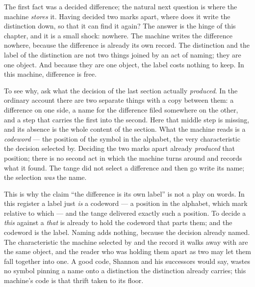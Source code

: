 The first fact was a decided difference; the natural next question is where the machine \emph{stores} it. Having
decided two marks apart, where does it write the distinction down, so that it can find it again? The answer is the
hinge of this chapter, and it is a small shock: nowhere. The machine writes the difference nowhere, because the
difference is already its own record. The distinction and the label of the distinction are not two things joined by an
act of naming; they are one object. And because they are one object, the label costs nothing to keep. In this machine,
difference is free.

To see why, ask what the decision of the last section actually \emph{produced}. In the ordinary account there are two
separate things with a copy between them: a difference on one side, a name for the difference filed somewhere on the
other, and a step that carries the first into the second. Here that middle step is missing, and its absence is the
whole content of the section. What the machine reads is a \emph{codeword} --- the position of the symbol in the
alphabet, the very characteristic the decision selected by. Deciding the two marks apart already \emph{produced} that
position; there is no second act in which the machine turns around and records what it found. The tange did not select
a difference and then go write its name; the selection \emph{was} the name.

This is why the claim ``the difference is its own label'' is not a play on words. In this register a label just
\emph{is} a codeword --- a position in the alphabet, which mark relative to which --- and the tange delivered exactly
such a position. To decide a \emph{this} against a \emph{that} is already to hold the codeword that parts them; and the
codeword is the label. Naming adds nothing, because the decision already named. The characteristic the machine selected
by and the record it walks away with are the same object, and the reader who was holding them apart as two may let them
fall together into one. A good code, Shannon and his successors would say, wastes no symbol pinning a name onto a
distinction the distinction already carries; this machine's code is that thrift taken to its floor.

